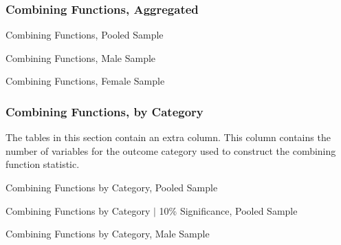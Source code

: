 \def\arraystretch{0.6}

\setlength\tabcolsep{0.3em}

\subsubsection{{Combining Functions, Aggregated}}


	\begin{table}[H]
     \caption{Combining Functions, Pooled Sample} 
     \label{table:abccare_rslt_pooled_counts}
	
	\end{table}  

	\begin{table}[H]
     \caption{Combining Functions, Male Sample} 
     \label{table:abccare_rslt_male_counts}
	
	\end{table}  

	\begin{table}[H]
     \caption{Combining Functions, Female Sample} 
     \label{table:abccare_rslt_female_counts}
	
	\end{table}  
\clearpage

\subsubsection{{Combining Functions, by Category}}

\noindent The tables in this section contain an extra column. This column contains the number of variables for the outcome category used to construct the combining function statistic. \\

	\begin{table}[H]
     \caption{Combining Functions by Category, Pooled Sample} 
     \label{table:abccare_rslt_pooled_counts_n50a100}
	
	\end{table}   

	\begin{table}[H]
     \caption{Combining Functions by Category $|$ 10\% Significance, Pooled Sample} 
     \label{table:abccare_rslt_pooled_counts_n10a10}
	
	\end{table}   

	\begin{table}[H]
     \caption{Combining Functions by Category, Male Sample} 
     \label{table:abccare_rslt_male_counts_n50a100}
	
	\end{table}   

